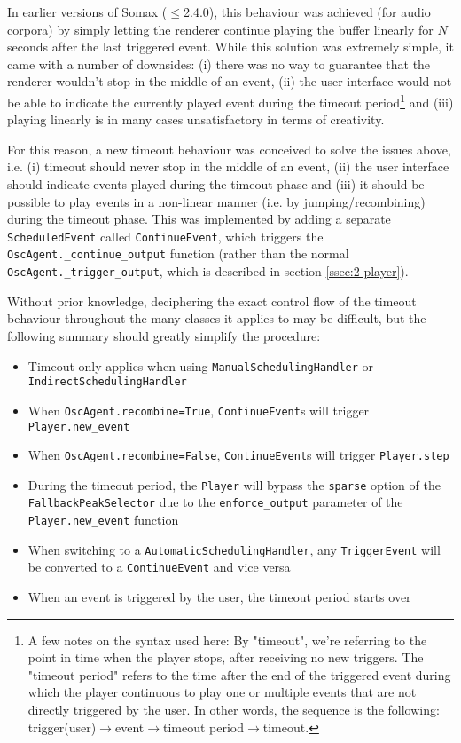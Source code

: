 In earlier versions of Somax ($\le$2.4.0), this behaviour was achieved (for audio corpora) by simply letting the renderer continue playing the buffer linearly for $N$ seconds after the last triggered event. While this solution was extremely simple, it came with a number of downsides: (i) there was no way to guarantee that the renderer wouldn't stop in the middle of an event, (ii) the user interface would not be able to indicate the currently played event during the timeout period\footnote{A few notes on the syntax used here: By "timeout", we're referring to the point in time when the player stops, after receiving no new triggers. The "timeout period" refers to the time after the end of the triggered event during which the player continuous to play one or multiple events that are not directly triggered by the user. In other words, the sequence is the following: trigger(user)$\rightarrow$event$\rightarrow$timeout period$\rightarrow$timeout.} and (iii) playing linearly is in many cases unsatisfactory in terms of creativity.

For this reason, a new timeout behaviour was conceived to solve the issues above, i.e. (i) timeout should never stop in the middle of an event, (ii) the user interface should indicate events played during the timeout phase and (iii) it should be possible to play events in a non-linear manner (i.e. by jumping/recombining) during the timeout phase. This was implemented by adding a separate \texttt{ScheduledEvent} called \texttt{ContinueEvent}, which triggers the \texttt{OscAgent.\_continue\_output} function (rather than the normal \texttt{OscAgent.\_trigger\_output}, which is described in section \ref{ssec:2-player}). 

Without prior knowledge, deciphering the exact control flow of the timeout behaviour throughout the many classes it applies to may be difficult, but the following summary should greatly simplify the procedure:

\begin{itemize}
	\item Timeout only applies when using \texttt{ManualSchedulingHandler} or \texttt{IndirectSchedulingHandler} 
	\item When \texttt{OscAgent.recombine=True}, \texttt{ContinueEvent}s will trigger \texttt{Player.new\_event}
	\item When \texttt{OscAgent.recombine=False}, \texttt{ContinueEvent}s will trigger \texttt{Player.step}
	\item During the timeout period, the \texttt{Player} will bypass the \texttt{sparse} option of the \texttt{FallbackPeakSelector} due to the \texttt{enforce\_output} parameter of the \texttt{Player.new\_event} function
	\item When switching to a \texttt{AutomaticSchedulingHandler}, any \texttt{TriggerEvent} will be converted to a \texttt{ContinueEvent} and vice versa
	\item When an event is triggered by the user, the timeout period starts over
\end{itemize}







